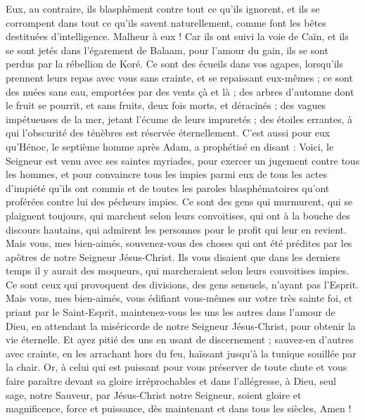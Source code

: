 \begin{multicols}{2}
Eux, au contraire, ils blasphèment contre tout ce qu'ils ignorent, et ils se corrompent dans tout ce qu'ils savent naturellement, comme font les bêtes destituées d'intelligence.
Malheur à eux ! Car ils ont suivi la voie de Caïn, et ils se sont jetés dans l’égarement de Balaam, pour l’amour du gain, ils se sont perdus par la rébellion de Koré.
Ce sont des écueils dans vos agapes, lorsqu’ils prennent leurs repas avec vous sans crainte, et se repaissant eux-mêmes ; ce sont des nuées sans eau, emportées par des vents çà et là ; des arbres d’automne dont le fruit se pourrit, et sans fruits, deux fois morts, et déracinés ;
des vagues impétueuses de la mer, jetant l'écume de leurs impuretés ; des étoiles errantes, à qui l'obscurité des ténèbres est réservée éternellement.
C’est aussi pour eux qu’Hénoc, le septième homme après Adam, a prophétisé en disant :
Voici, le Seigneur est venu avec ses saintes myriades, pour exercer un jugement contre tous les hommes, et pour convaincre tous les impies parmi eux de tous les actes d'impiété qu’ils ont commis et de toutes les paroles blasphématoires qu’ont proférées contre lui des pécheurs impies.
Ce sont des gens qui murmurent, qui se plaignent toujours, qui marchent selon leurs convoitises, qui ont à la bouche des discours hautains, qui admirent les personnes pour le profit qui leur en revient.
Mais vous, mes bien-aimés, souvenez-vous des choses qui ont été prédites par les apôtres de notre Seigneur Jésus-Christ.
Ils vous disaient que dans les derniers temps il y aurait des moqueurs, qui marcheraient selon leurs convoitises impies.
Ce sont ceux qui provoquent des divisions, des gens sensuels, n'ayant pas l'Esprit.
Mais vous, mes bien-aimés, vous édifiant vous-mêmes sur votre très sainte foi, et priant par le Saint-Esprit,
maintenez-vous les uns les autres dans l'amour de Dieu, en attendant la miséricorde de notre Seigneur Jésus-Christ, pour obtenir la vie éternelle.
Et ayez pitié des uns en usant de discernement ;
sauvez-en d’autres avec crainte, en les arrachant hors du feu, haïssant jusqu’à la tunique souillée par la chair.
Or, à celui qui est puissant pour vous préserver de toute chute et vous faire paraître devant sa gloire irréprochables et dans l’allégresse,
à Dieu, seul sage, notre Sauveur, par Jésus-Christ notre Seigneur, soient gloire et magnificence, force et puissance, dès maintenant et dans tous les siècles, Amen !
\PPE{}
\end{multicols}
